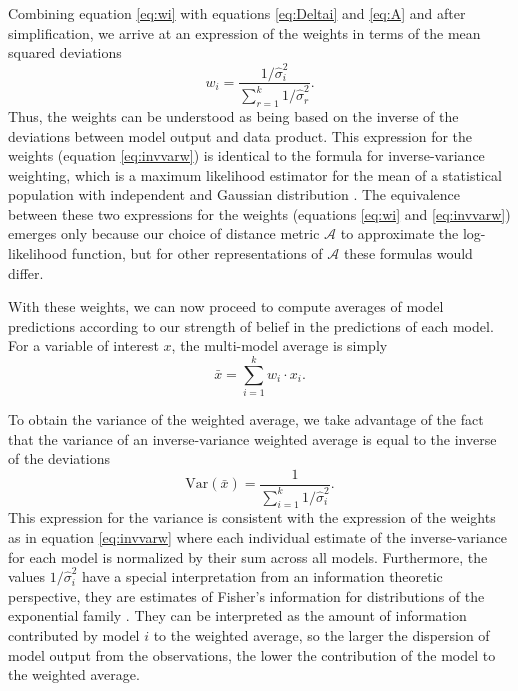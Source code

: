 \documentclass[gmd, manuscript]{copernicus}
\begin{document}
Combining equation \eqref{eq:wi} with equations \eqref{eq:Deltai} and \eqref{eq:A} and after simplification, we arrive at an expression of the weights in terms of the mean squared deviations
\begin{equation} \label{eq:invvarw}
w_i = \frac{1/\hat{\sigma}^2_i}{\sum^k_{r=1} 1/\hat{\sigma}^2_r}.
\end{equation}
Thus, the weights can be understood as being based on the inverse of the deviations between model output and data product. This expression for the weights (equation \ref{eq:invvarw}) is identical to the formula for inverse-variance weighting, which is a maximum likelihood estimator for the mean of a statistical population with independent and Gaussian distribution \citep{Bonamente2022}. The equivalence between these two expressions for the weights (equations \eqref{eq:wi} and \eqref{eq:invvarw}) emerges only because our choice of distance metric $\mathcal{A}$ to approximate the log-likelihood function, but for other representations of $\mathcal{A}$ these formulas would differ. 

With these weights, we can now proceed to compute averages of model predictions according to our strength of belief in the predictions of each model. 
For a variable of interest $x$, the multi-model average is simply
\begin{equation}
\bar{x} = \sum_{i=1}^k w_i \cdot x_i.
\end{equation}

To obtain the variance of the weighted average, we take advantage of the fact that the variance of an inverse-variance weighted average is equal to the inverse of the deviations \citep{Bonamente2022, Kanters2022, Rotondi2022}
\begin{equation}
\mathrm{Var}(\bar{x}) = \frac{1}{\sum_{i=1}^k 1/\hat{\sigma}_i^2}.
\end{equation}
This expression for the variance is consistent with the expression of the weights as in equation \eqref{eq:invvarw} where each individual estimate of the inverse-variance for each model is normalized by their sum across all models. Furthermore, the values $1/\hat{\sigma}^2_i$ have a special interpretation from an information theoretic perspective, they are estimates of Fisher's information for distributions of the exponential family \citep{Rotondi2022}. They can be interpreted as the amount of information contributed by model $i$ to the weighted average, so the larger the dispersion of model output from the observations, the lower the contribution of the model to the weighted average. 
\end{document}
